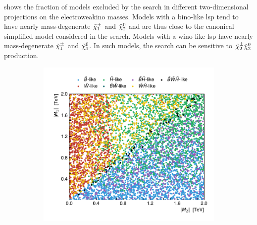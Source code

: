  shows the fraction of models excluded by the \onelepton search in different two-dimensional projections on the electroweakino masses.
Models with a bino-like \gls{lsp} tend to have nearly mass-degenerate $\tilde{\chi}_1^\pm$ and $\tilde{\chi}_2^0$ and are thus close to the canonical simplified model considered in the search. Models with a wino-like \gls{lsp} have nearly mass-degenerate $\tilde{\chi}_1^\pm$ and $\tilde{\chi}_1^0$. In such models, the \onelepton search can be sensitive to $\tilde{\chi}_2^\pm\tilde{\chi}_2^0$ production.

 \begin{figure}[H]
	\centering
	\begin{subfigure}[b]{0.47\linewidth}
		\centering\includegraphics[width=\textwidth]{scatter/lsp_types_M1_M2}
	\end{subfigure}\hfill
	\begin{subfigure}[b]{0.47\linewidth}

\end{subfigure}
\end{figure}
